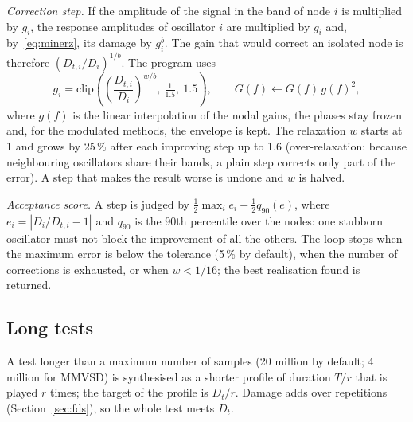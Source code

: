 \emph{Correction step.} If the amplitude of the signal in the band of node $i$ is multiplied by $g_i$,
the response amplitudes of oscillator $i$ are multiplied by $g_i$ and, by~\eqref{eq:minerz}, its damage
by $g_i^b$. The gain that would correct an isolated node is therefore $(D_{t,i}/D_i)^{1/b}$. The
program uses
\begin{equation}\label{eq:gain}
  g_i = \mathrm{clip}\!\left(\left(\frac{D_{t,i}}{D_i}\right)^{w/b},\ \tfrac{1}{1.5},\ 1.5\right),
  \qquad G(f)\leftarrow G(f)\,g(f)^2,
\end{equation}
where $g(f)$ is the linear interpolation of the nodal gains, the phases stay frozen and, for the
modulated methods, the envelope is kept. The relaxation $w$ starts at 1 and grows by 25\,\% after each
improving step up to 1.6 (over-relaxation: because neighbouring oscillators share their bands, a
plain step corrects only part of the error). A step that makes the result worse is undone and $w$ is
halved.

\emph{Acceptance score.} A step is judged by $\tfrac12\max_i e_i + \tfrac12 q_{90}(e)$, where
$e_i = |D_i/D_{t,i}-1|$ and $q_{90}$ is the 90th percentile over the nodes: one stubborn oscillator
must not block the improvement of all the others. The loop stops when the maximum error is below the
tolerance (5\,\% by default), when the number of corrections is exhausted, or when $w<1/16$; the best
realisation found is returned.

\subsection{Long tests}\label{sec:repeats}

A test longer than a maximum number of samples (20 million by default; 4 million for MMVSD) is
synthesised as a shorter profile of duration $T/r$ that is played $r$ times; the target of the
profile is $D_t/r$. Damage adds over repetitions (Section~\ref{sec:fds}), so the whole test meets
$D_t$.
